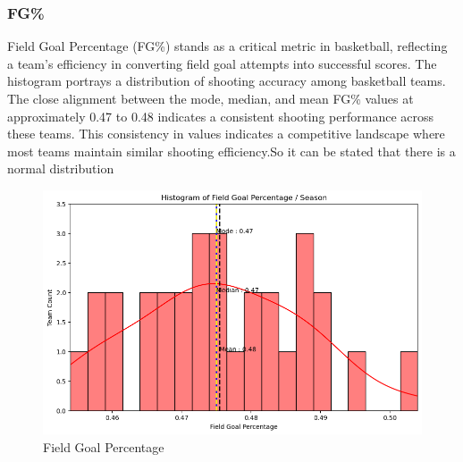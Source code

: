 \documentclass[conference]{IEEEtran}
\begin{document}
\subsubsection{FG\%}
Field Goal Percentage (FG\%) stands as a critical metric in basketball, reflecting a team's efficiency in converting field goal attempts into successful scores. The histogram portrays a distribution of shooting accuracy among basketball teams. The close alignment between the mode, median, and mean FG\% values at approximately 0.47 to 0.48 indicates a consistent shooting performance across these teams. This consistency in values indicates a competitive landscape where most teams maintain similar shooting efficiency.So it can be stated that there is a normal distribution
\begin{figure}[h]
    \centering
    \includegraphics[scale=0.41]{FG_image.png}
    \caption{Field Goal Percentage}
    \label{fig:enter-label}
\end{figure}
\vspace{\baselineskip}
\vspace{\baselineskip}
\vspace{\baselineskip}
\end{document}
